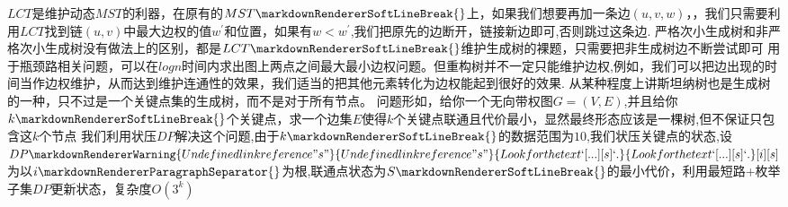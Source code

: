 {}
\markdownRendererSectionEnd \markdownRendererSectionBegin
{}\markdownRendererInterblockSeparator
{}$ LCT $是维护动态$ MST $的利器，在原有的$ MST\markdownRendererSoftLineBreak
{}$上，如果我们想要再加一条边$ (u,v,w) $，，我们只需要利用$ LCT $找到链$ (u,v) $中最大边权的值$ w^{'} $和位置，如果有$ w<w^{'} $,我们把原先的边断开，链接新边即可,否则跳过这条边.\markdownRendererInterblockSeparator
{}\markdownRendererSectionBegin
{}\markdownRendererInterblockSeparator
{}严格次小生成树和非严格次小生成树没有做法上的区别，都是$ LCT\markdownRendererSoftLineBreak
{}$维护生成树的裸题，只需要把非生成树边不断尝试即可\markdownRendererInterblockSeparator
{}
\markdownRendererSectionEnd 
\markdownRendererSectionEnd \markdownRendererSectionBegin
{}\markdownRendererInterblockSeparator
{}用于瓶颈路相关问题，可以在$ logn $时间内求出图上两点之间最大最小边权问题。但重构树并不一定只能维护边权,例如，我们可以把边出现的时间当作边权维护，从而达到维护连通性的效果，我们适当的把其他元素转化为边权能起到很好的效果.\markdownRendererInterblockSeparator
{}\markdownRendererInterblockSeparator
{}
\markdownRendererSectionEnd \markdownRendererSectionBegin
{}\markdownRendererInterblockSeparator
{}从某种程度上讲斯坦纳树也是生成树的一种，只不过是一个关键点集的生成树，而不是对于所有节点。\markdownRendererParagraphSeparator
{}问题形如，给你一个无向带权图$ G=(V,E) $,并且给你$ k\markdownRendererSoftLineBreak
{}$个关键点，求一个边集$ E $使得$ k $个关键点联通且代价最小，显然最终形态应该是一棵树,但不保证只包含这$ k $个节点\markdownRendererParagraphSeparator
{}我们利用状压$ DP $解决这个问题,由于$ k\markdownRendererSoftLineBreak
{}$的数据范围为$ 10 $,我们状压关键点的状态,设$ DP\markdownRendererWarning{Undefined link reference "s"}{Undefined link reference "s"}{Look for the text `[...][s]`.}{Look for the text `[...][s]`.}[i][s] $为以$ i\markdownRendererParagraphSeparator
{} $为根,联通点状态为$ S\markdownRendererSoftLineBreak
{}$的最小代价，利用最短路+枚举子集$ DP $更新状态，复杂度$ O(3^k) $\markdownRendererInterblockSeparator
{}\markdownRendererInterblockSeparator
{}
\markdownRendererSectionEnd 
\markdownRendererSectionEnd \markdownRendererSectionBegin
{}\markdownRendererInterblockSeparator
{}\markdownRendererSectionBegin

